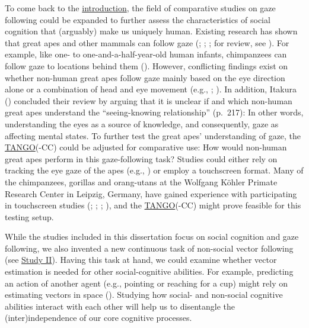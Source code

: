 \documentclass[
]{scrbook}
\begin{document}
To come back to the \hyperref[introduction]{introduction}, the field of comparative studies on gaze following could be expanded to further assess the characteristics of social cognition that (arguably) make us uniquely human. Existing research has shown that great apes and other mammals can follow gaze (; ; ; for review, see ). For example, like one- to one-and-a-half-year-old human infants, chimpanzees can follow gaze to locations behind them (). However, conflicting findings exist on whether non-human great apes follow gaze mainly based on the eye direction alone or a combination of head and eye movement (e.g., ; ). In addition, Itakura () concluded their review by arguing that it is unclear if and which non-human great apes understand the ``seeing-knowing relationship'' (p.~217): In other words, understanding the eyes as a source of knowledge, and consequently, gaze as affecting mental states. To further test the great apes' understanding of gaze, the \hyperref[acronyms_TANGO]{TANGO}(-CC) could be adjusted for comparative use: How would non-human great apes perform in this gaze-following task? Studies could either rely on tracking the eye gaze of the apes (e.g., ) or employ a touchscreen format. Many of the chimpanzees, gorillas and orang-utans at the Wolfgang Köhler Primate Research Center in Leipzig, Germany, have gained experience with participating in touchscreen studies (; ; ; ), and the \hyperref[acronyms_TANGO]{TANGO}(-CC) might prove feasible for this testing setup.

While the studies included in this dissertation focus on social cognition and gaze following, we also invented a new continuous task of non-social vector following (see \hyperref[studyII]{Study II}). Having this task at hand, we could examine whether vector estimation is needed for other social-cognitive abilities. For example, predicting an action of another agent (e.g., pointing or reaching for a cup) might rely on estimating vectors in space (). Studying how social- and non-social cognitive abilities interact with each other will help us to disentangle the (inter)independence of our core cognitive processes.
\end{document}
